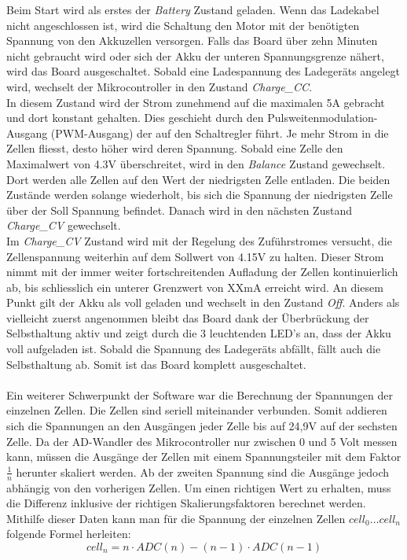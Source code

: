 Beim Start wird als erstes der \textit{Battery} Zustand geladen. Wenn das Ladekabel nicht angeschlossen ist, wird die Schaltung den Motor mit der benötigten Spannung von den Akkuzellen versorgen. Falls das Board über zehn Minuten nicht gebraucht wird oder sich der Akku der unteren Spannungsgrenze nähert, wird das Board ausgeschaltet. Sobald eine Ladespannung des Ladegeräts angelegt wird, wechselt der Mikrocontroller in den Zustand \textit{Charge\_CC}.\\
In diesem Zustand wird der Strom zunehmend auf die maximalen 5A gebracht und dort konstant gehalten. Dies geschieht durch den Pulsweitenmodulation-Ausgang (PWM-Ausgang) der auf den Schaltregler führt. Je mehr Strom in die Zellen fliesst, desto höher wird deren Spannung. Sobald eine Zelle den Maximalwert von 4.3V überschreitet, wird in den \textit{Balance} Zustand gewechselt. Dort werden alle Zellen auf den Wert der niedrigsten Zelle entladen. Die beiden Zustände werden solange wiederholt, bis sich die  Spannung der niedrigsten Zelle über der Soll Spannung befindet.  Danach wird in den nächsten Zustand \textit{Charge\_CV} gewechselt. \\
Im \textit{Charge\_CV} Zustand wird mit der Regelung des Zuführstromes versucht, die Zellenspannung weiterhin auf dem Sollwert von 4.15V zu halten. Dieser Strom nimmt mit der immer weiter fortschreitenden Aufladung der Zellen kontinuierlich ab, bis schliesslich ein unterer Grenzwert von XXmA  erreicht wird. An diesem Punkt gilt der Akku als voll geladen und wechselt in den Zustand \textit{Off}.
Anders als vielleicht zuerst angenommen bleibt das Board dank der Überbrückung der Selbsthaltung aktiv und zeigt durch die 3 leuchtenden LED’s an, dass der Akku voll aufgeladen ist. Sobald  die Spannung des Ladegeräts abfällt, fällt auch die Selbsthaltung ab. Somit ist das Board komplett ausgeschaltet.
\\\\
Ein weiterer Schwerpunkt der Software war die Berechnung der Spannungen der einzelnen Zellen. Die Zellen sind seriell miteinander verbunden. Somit addieren sich die Spannungen an den Ausgängen jeder Zelle bis auf 24,9V auf der sechsten Zelle. Da der AD-Wandler des Mikrocontroller nur zwischen 0 und 5 Volt messen kann, müssen die Ausgänge der Zellen mit einem Spannungsteiler mit dem Faktor \(\frac 1n\) herunter skaliert werden. Ab der zweiten Spannung sind die Ausgänge jedoch abhängig von den vorherigen Zellen. Um einen richtigen Wert zu erhalten, muss die Differenz inklusive der richtigen Skalierungsfaktoren berechnet werden. Mithilfe dieser Daten kann man für die Spannung der einzelnen Zellen \(cell_0 \dots cell_n\) folgende Formel herleiten:
\begin{equation}
	cell_n = n \cdot ADC(n) - (n-1)\cdot ADC(n-1)
	\label{eq:CellNSpannung}
\end{equation}

